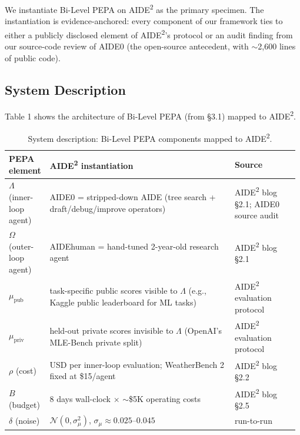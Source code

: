 \documentclass{article}
\theoremstyle{definition}
\begin{document}
We instantiate Bi-Level PEPA on AIDE\textsuperscript{2} \cite{weco2024aide} as the primary specimen. The instantiation is evidence-anchored: every component of our framework ties to either a publicly disclosed element of AIDE\textsuperscript{2}'s protocol or an audit finding from our source-code review of AIDE0 \cite{weco2024aide} (the open-source antecedent, with $\sim$2,600 lines of public code).

\subsection{System Description}

Table 1 shows the architecture of Bi-Level PEPA (from \S3.1) mapped to AIDE\textsuperscript{2}.

\begin{table}[h]
\centering
\caption{System description: Bi-Level PEPA components mapped to AIDE\textsuperscript{2}.}
\label{tab:system-description}
\small\setlength{\tabcolsep}{4pt}\begin{tabular}{@{}p{0.13\linewidth}p{0.63\linewidth}p{0.22\linewidth}@{}}
\toprule
PEPA element & AIDE\textsuperscript{2} instantiation & Source \\
\midrule
$\Lambda$ (inner-loop agent) & AIDE0 = stripped-down AIDE (tree search + draft/debug/improve operators) & AIDE\textsuperscript{2} blog \S2.1; AIDE0 source audit \\
$\Omega$ (outer-loop agent) & AIDEhuman = hand-tuned 2-year-old research agent & AIDE\textsuperscript{2} blog \S2.1 \\
$\mu_{\text{pub}}$ & task-specific public scores visible to $\Lambda$ (e.g., Kaggle public leaderboard for ML tasks) & AIDE\textsuperscript{2} evaluation protocol \\
$\mu_{\text{priv}}$ & held-out private scores invisible to $\Lambda$ (OpenAI's MLE-Bench private split) & AIDE\textsuperscript{2} evaluation protocol \\
$\rho$ (cost) & USD per inner-loop evaluation; WeatherBench 2 fixed at \$15/agent & AIDE\textsuperscript{2} blog \S2.2 \\
$B$ (budget) & 8 days wall-clock $\times$ $\sim$\$5K operating costs & AIDE\textsuperscript{2} blog \S2.5 \\
$\delta$ (noise) & $\mathcal{N}(0, \sigma^2_\mu)$, $\sigma_\mu \approx 0.025$--$0.045$ & run-to-run \\
\bottomrule
\end{tabular}
\end{table}
\end{document}
